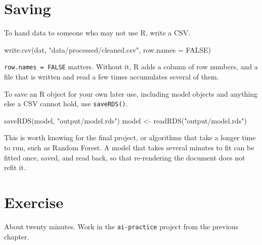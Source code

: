 \documentclass[
  a4paper,
]{scrbook}
\newenvironment{Shaded}{\begin{snugshade}}{\end{snugshade}}
\newcommand{\AttributeTok}[1]{\textcolor[rgb]{0.40,0.45,0.13}{#1}}
\newcommand{\ConstantTok}[1]{\textcolor[rgb]{0.56,0.35,0.01}{#1}}
\newcommand{\FunctionTok}[1]{\textcolor[rgb]{0.28,0.35,0.67}{#1}}
\newcommand{\NormalTok}[1]{\textcolor[rgb]{0.00,0.23,0.31}{#1}}
\newcommand{\OtherTok}[1]{\textcolor[rgb]{0.00,0.23,0.31}{#1}}
\newcommand{\StringTok}[1]{\textcolor[rgb]{0.13,0.47,0.30}{#1}}
\begin{document}
\section*{Saving}\label{saving}


To hand data to someone who may not use R, write a CSV.

\begin{Shaded}
\begin{Highlighting}[]
\FunctionTok{write.csv}\NormalTok{(dat, }\StringTok{"data/processed/cleaned.csv"}\NormalTok{, }\AttributeTok{row.names =} \ConstantTok{FALSE}\NormalTok{)}
\end{Highlighting}
\end{Shaded}

\texttt{row.names\ =\ FALSE} matters. Without it, R adds a column of row
numbers, and a file that is written and read a few times accumulates
several of them.

To save an R object for your own later use, including model objects and
anything else a CSV cannot hold, use \texttt{saveRDS()}.

\begin{Shaded}
\begin{Highlighting}[]
\FunctionTok{saveRDS}\NormalTok{(model, }\StringTok{"output/model.rds"}\NormalTok{)}
\NormalTok{model }\OtherTok{\textless{}{-}} \FunctionTok{readRDS}\NormalTok{(}\StringTok{"output/model.rds"}\NormalTok{)}
\end{Highlighting}
\end{Shaded}

This is worth knowing for the final project, or algorithms that take a
longer time to run, such as Random Forest. A model that takes several
minutes to fit can be fitted once, saved, and read back, so that
re-rendering the document does not refit it.

\section*{Exercise}\label{exercise-3}


About twenty minutes. Work in the \texttt{ai-practice} project from the
previous chapter.
\end{document}
